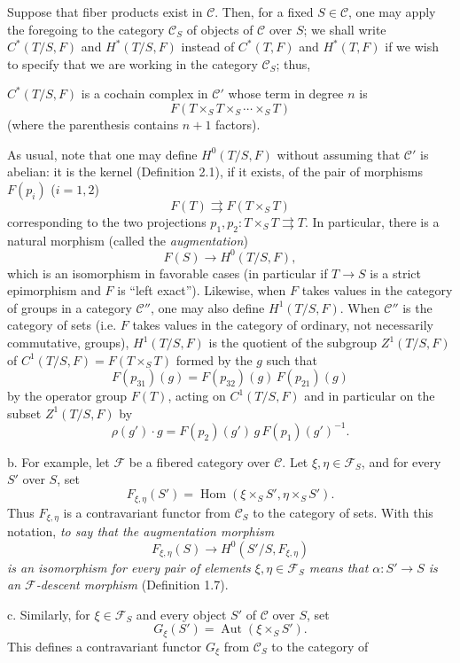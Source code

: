 Suppose that fiber products exist in $\mathcal C$. Then, for a fixed
$S\in\mathcal C$, one may apply the foregoing to the category $\mathcal C_S$ of
objects of $\mathcal C$ over $S$; we shall write $C^*(T/S,F)$ and
$H^*(T/S,F)$ instead of $C^*(T,F)$ and $H^*(T,F)$ if we wish to specify that
we are working in the category $\mathcal C_S$; thus,

$C^*(T/S,F)$ is a cochain complex in $\mathcal C'$ whose term in degree $n$ is
\[
  F(T\times_ST\times_S\cdots\times_ST)
\]
(where the parenthesis contains $n+1$ factors).

As usual, note that one may define $H^0(T/S,F)$ without assuming that
$\mathcal C'$ is abelian: it is the kernel (Definition 2.1), if it exists, of
the pair of morphisms $F(p_i)$ ($i=1,2$)
\[
  F(T)\rightrightarrows F(T\times_ST)
\]
corresponding to the two projections
$p_1,p_2:T\times_ST\rightrightarrows T$. In particular, there is a natural
morphism (called the \emph{augmentation})
\[
  F(S)\longrightarrow H^0(T/S,F),
\]
which is an isomorphism in favorable cases (in particular if
$T\longrightarrow S$ is a strict epimorphism and $F$ is “left exact”).
Likewise, when $F$ takes values in the category of groups in a category
$\mathcal C''$, one may also define $H^1(T/S,F)$. When $\mathcal C''$ is the
category of sets (i.e. $F$ takes values in the category of ordinary, not
necessarily commutative, groups), $H^1(T/S,F)$ is the quotient of the subgroup
$Z^1(T/S,F)$ of $C^1(T/S,F)=F(T\times_ST)$ formed by the $g$ such that
\[
  F(p_{31})(g)=F(p_{32})(g)\,F(p_{21})(g)
\]
by the operator group $F(T)$, acting on $C^1(T/S,F)$ and in particular on the
subset $Z^1(T/S,F)$ by
\[
  \rho(g')\cdot g=F(p_2)(g')\,g\,F(p_1)(g')^{-1}.
\]

\medskip\noindent
b. For example, let $\mathcal F$ be a fibered category over $\mathcal C$. Let
$\xi,\eta\in\mathcal F_S$, and for every $S'$ over $S$, set
\[
  F_{\xi,\eta}(S')=
  \operatorname{Hom}(\xi\times_SS',\eta\times_SS').
\]
Thus $F_{\xi,\eta}$ is a contravariant functor from $\mathcal C_S$ to the
category of sets. With this notation, \emph{to say that the augmentation
morphism}
\[
  F_{\xi,\eta}(S)\longrightarrow H^0(S'/S,F_{\xi,\eta})
\]
\emph{is an isomorphism for every pair of elements
$\xi,\eta\in\mathcal F_S$ means that
$\alpha:S'\longrightarrow S$ is an $\mathcal F$-descent morphism}
(Definition 1.7).

\medskip\noindent
c. Similarly, for $\xi\in\mathcal F_S$ and every object $S'$ of $\mathcal C$
over $S$, set
\[
  G_\xi(S')=\operatorname{Aut}(\xi\times_SS').
\]
This defines a contravariant functor $G_\xi$ from $\mathcal C_S$ to the
category of

